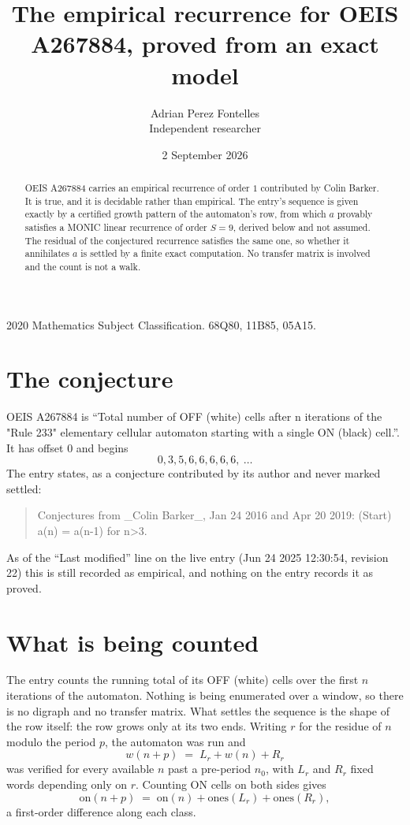 \documentclass[11pt,a4paper]{article}
\title{The empirical recurrence for OEIS A267884, proved from an exact model}
\author{Adrian Perez Fontelles\\ \small Independent researcher}
\date{2 September 2026}
\theoremstyle{plain}
\theoremstyle{definition}
\begin{document}
\maketitle

\begin{abstract}
OEIS A267884 carries an empirical recurrence of order $1$ contributed by Colin Barker. It is true, and it is
decidable rather than empirical. The entry's sequence is given exactly by a certified growth pattern of the automaton's row, from
which $a$ provably satisfies a MONIC linear recurrence of order $S=9$, derived below and not
assumed. The residual of the conjectured recurrence satisfies the same one, so whether it
annihilates $a$ is settled by a finite exact computation. No transfer matrix is involved and
the count is not a walk.
\end{abstract}

\noindent\small 2020 Mathematics Subject Classification. 68Q80, 11B85, 05A15.\normalsize

\section{The conjecture}

OEIS A267884 is ``Total number of OFF (white) cells after n iterations of the "Rule 233" elementary cellular automaton starting with a single ON (black) cell.''. It has offset $0$ and begins
\[
0, 3, 5, 6, 6, 6, 6, 6,\ \dots
\]
The entry states, as a conjecture contributed by its author and never marked settled:
\begin{quote}
Conjectures from \_Colin Barker\_, Jan 24 2016 and Apr 20 2019: (Start) a(n) = a(n-1) for n>3.
\end{quote}
As of the ``Last modified'' line on the live entry (Jun 24 2025 12:30:54, revision 22)
this is still recorded as empirical, and nothing on the entry records it as proved.

\section{What is being counted}

The entry counts the running total of its OFF (white) cells over the first $n$ iterations of the automaton. Nothing is being enumerated over a window, so there is
no digraph and no transfer matrix. What settles the sequence is the shape of the row itself:
the row grows only at its two ends. Writing
$r$ for the residue of $n$ modulo the period $p$, the automaton was run and
\[
w(n+p)\;=\;L_r + w(n) + R_r
\]
was verified for every available $n$ past a
pre-period $n_0$, with $L_r$ and $R_r$ fixed words depending only on $r$. Counting ON cells on
both sides gives
\[
\mathrm{on}(n+p)\;=\;\mathrm{on}(n)+\mathrm{ones}(L_r)+\mathrm{ones}(R_r),
\]
a first-order difference along each class.
\end{document}

